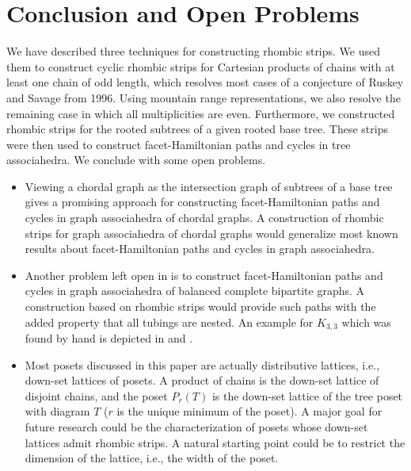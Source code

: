 \documentclass[fontsize=11pt,a4paper,DIV=12]{scrartcl}
\begin{document}
\section{Conclusion and Open Problems}\label{sec:conclusion}
We have described three techniques for constructing rhombic strips. We used
them to construct cyclic rhombic strips for Cartesian products of chains
with at least one chain of odd length, which resolves most cases of a
conjecture of Ruskey and Savage from 1996. Using mountain range representations, we also resolve the remaining case in which all multiplicities are even. Furthermore, we constructed rhombic
strips for the rooted subtrees of a given rooted base tree. These strips were
then used to construct facet-Hamiltonian paths and cycles in tree
associahedra. We conclude with some open problems.

\begin{itemize}
	\item Viewing a chordal graph as the intersection graph of subtrees of a
	      base tree gives a promising approach for constructing facet-Hamiltonian paths
	      and cycles in graph associahedra of chordal graphs. A construction of
	      rhombic strips for graph associahedra of chordal graphs would generalize
	      most known results about facet-Hamiltonian paths and cycles in graph
	      associahedra.
	\item Another problem left open in \cite{facethamiltonicity} is to
	      construct facet-Hamiltonian paths and cycles in graph associahedra of balanced
	      complete bipartite graphs. A construction based on rhombic strips would
	      provide such paths with the added property that all tubings are nested. An example for $K_{3,3}$ which was found by hand is depicted in  and .
	\item Most posets discussed in this paper are actually distributive lattices,
	      i.e., down-set lattices of posets. A product of chains is the down-set lattice of
	      disjoint chains, and the poset $P_r(T)$ is the down-set lattice of the tree poset
	      with diagram $T$ ($r$ is the unique minimum of the poset). A major goal for
	      future research could be the characterization of posets whose down-set
	      lattices admit rhombic strips. A natural starting point could be to
	      restrict the dimension of the lattice, i.e., the width of the poset.
\end{itemize}


\begin{refcontext}[sorting=none] %
	\printbibliography
\end{refcontext}
\end{document}

